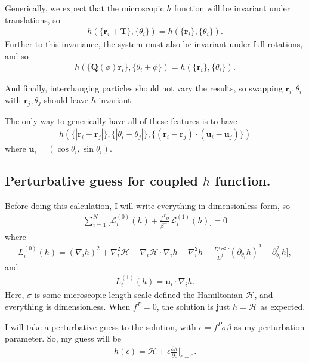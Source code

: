 \documentclass{article}
\begin{document}
Generically, we expect that the microscopic $h$ function will be invariant under translations,
so
\begin{align}
  h(\{\bm{r}_i+\bm{T}\},\{\theta_i\}) = h(\{\bm{r}_i\},\{\theta_i\}).
\end{align}
Further to this invariance, the system must also be invariant
under full rotations, and so
\begin{align}
  h(\{\bm{Q}(\phi)\bm{r}_i\},\{\theta_i+\phi\})
  =h(\{\bm{r}_i\},\{\theta_i\}).
\end{align}

And finally, interchanging particles should not vary the results, so swapping $\bm{r}_i,\theta_i$
with $\bm{r}_j,\theta_j$ should leave $h$ invariant.

The only way to generically have all of these features is to have
\begin{align}
  h(\{|\bm{r}_i-\bm{r}_j|\},\{|\theta_i-\theta_j|\},
  \{(\bm{r}_i-\bm{r}_j)\cdot(\bm{u}_i-\bm{u}_j)\})
\end{align}
where $\bm{u}_i = (\cos\theta_i,\sin\theta_i)$.

\subsection{Perturbative guess for coupled $h$ function.}

Before doing this calculation, I will write everything in dimensionless form, so
\begin{align}\label{eq:dim_ss}
  \sum_{i=1}^N\big[\mathcal{L}_i^{(0)}(h)+ \frac{f^P\sigma}{\beta^{-1}}
  \mathcal{L}_i^{(1)}(h)\big] = 0
\end{align}
where
\begin{align}
  L_i^{(0)}(h)=(\nabla_i h)^2 + \nabla_i^2\mathcal{H}
  -\nabla_i\mathcal{H}\cdot\nabla_ih-\nabla_i^2h +\frac{D^r\sigma^2}{D^t}
  \big[(\partial_{\theta_i}h)^2-\partial_{\theta_i}^2h\big],
\end{align}
and
\begin{align}
  L_i^{(1)}(h)=\bm{u}_i\cdot\nabla_ih.
\end{align}
Here, $\sigma$ is some microscopic length scale defined the Hamiltonian
$\mathcal{H}$, and everything is dimensionless. When $f^P=0$, the solution
is just $h=\mathcal{H}$ as expected.

I will take a perturbative guess to the solution, with $\epsilon=f^P\sigma\beta$
as my perturbation parameter. So, my guess will be
\begin{align}\label{eq:hperturb}
  h(\epsilon) = \mathcal{H}
  + \epsilon\frac{\partial h}{\partial \epsilon}\bigg|_{\epsilon=0}.
\end{align}
\end{document}
